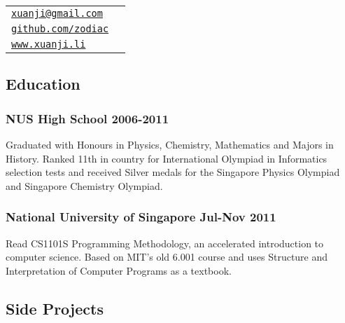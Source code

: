 \documentclass[letterpaper]{article}
\def\name{Li Xuanji}
\begin{document}
\vspace{0.25in}

\begin{minipage}{0.8\linewidth}
\resizebox{0.5\linewidth}{!}{\fontsize{30}{36}\selectfont \name}
\end{minipage}
\begin{minipage}{0.2\linewidth}
  \begin{tabular}{ll}
    \href{mailto:xuanji@gmail.com}{\tt xuanji@gmail.com} \\
    \href{https://github.com/zodiac}{\tt github.com/zodiac} \\
    \href{www.xuanji.li}{\tt www.xuanji.li}
  \end{tabular}
\end{minipage}

\vspace{2em}

\begin{center}
\section*{Education}
\end{center}

\subsubsection*{NUS High School \hfill 2006-2011}
Graduated with Honours in Physics, Chemistry, Mathematics and Majors in History. Ranked 11th in country for International Olympiad in Informatics selection tests and received Silver medals for the Singapore Physics Olympiad and Singapore Chemistry Olympiad.

\subsubsection*{National University of Singapore \hfill Jul-Nov 2011}
Read CS1101S Programming Methodology, an accelerated introduction to computer science. Based on MIT's old 6.001 course and uses Structure and Interpretation of Computer Programs as a textbook.

\vspace{1em}

\begin{center}
\section*{Side Projects}
\end{center}
\end{document}
